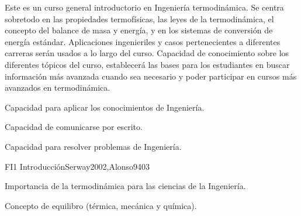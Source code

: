 \begin{syllabus}


\begin{justification}
Este es un curso general introductorio en Ingeniería termodinámica. 
Se centra sobretodo en las propiedades termofísicas, las leyes de la termodinámica, 
el concepto del balance de masa y energía, y en los sistemas de conversión de energía estándar.
Aplicaciones ingenieriles y casos pertenecientes a diferentes carreras serán usados a lo largo del curso.
Capacidad de conocimiento sobre los diferentes tópicos del curso, establecerá las bases para los estudiantes
en buscar información más avanzada cuando sea necesario y poder participar en cursos más avanzados en termodinámica.

% 

\end{justification}

\begin{goals}
\item Capacidad para aplicar los conocimientos de Ingeniería.
\item Capacidad de comunicarse por escrito.
\item Capacidad para resolver problemas de Ingeniería.


\end{goals}

\begin{outcomes}
\end{outcomes}

\begin{unit}{FI1 Introducción}{Serway2002,Alonso94}{0}{3}
\begin{topics}
      \item Importancia de la termodinámica para las ciencias de la Ingeniería.
      \item Concepto de equilibro (térmica, mecánica y química).
      

\end{topics}
\end{unit}
\end{syllabus}
